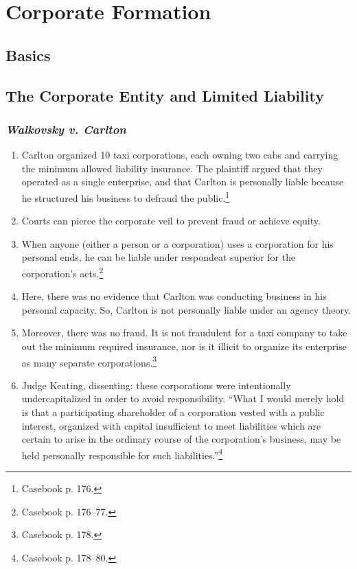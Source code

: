 \section{Corporate Formation}

\subsection{Basics}


\subsection{The Corporate Entity and Limited Liability}

\subsubsection{\emph{Walkovsky v. Carlton}}

\begin{enumerate}
    \item Carlton organized 10 taxi corporations, each owning two cabs and 
    carrying the minimum allowed liability insurance. The plaintiff argued 
    that they operated as a single enterprise, and that Carlton is personally 
    liable because he structured his business to defraud the 
    public.\footnote{Casebook p. 176.}
    \item Courts can pierce the corporate veil to prevent fraud or achieve 
    equity.
    \item When anyone (either a person or a corporation) uses a corporation 
    for his personal ends, he can be liable under respondeat superior for the 
    corporation's acts.\footnote{Casebook p. 176--77.}
    \item Here, there was no evidence that Carlton was conducting business in 
    his personal capacity. So, Carlton is not personally liable under an 
    agency theory.
    \item Moreover, there was no fraud. It is not fraudulent for a taxi 
    company to take out the minimum required insurance, nor is it illicit to 
    organize its enterprise as many separate corporations.\footnote{Casebook 
    p. 178.}
    \item Judge Keating, dissenting: these corporations were intentionally 
    undercapitalized in order to avoid responsibility. ``What I would merely 
    hold is that a participating shareholder of a corporation vested with a 
    public interest, organized with capital insufficient to meet liabilities 
    which are certain to arise in the ordinary course of the corporation's 
    business, may be held personally responsible for such 
    liabilities.''\footnote{Casebook p. 178--80.}
\end{enumerate}

